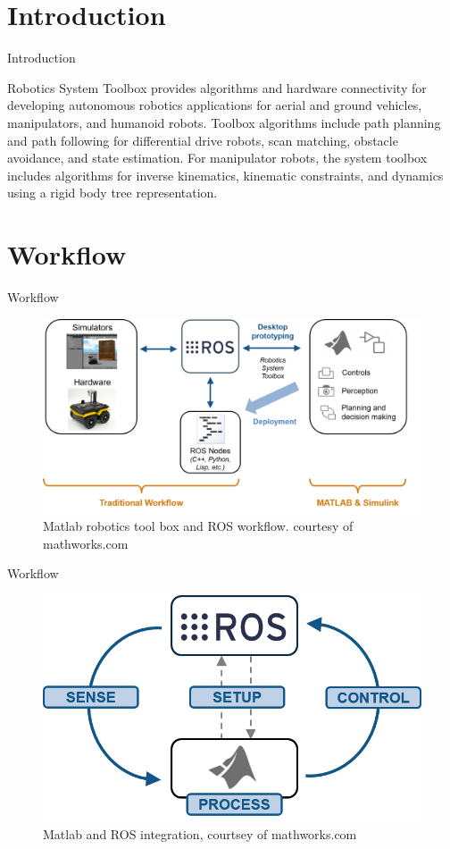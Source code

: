 \documentclass{beamer}
\begin{document}
\section{Introduction}
\begin{frame}{Introduction}
\begin{block}{}
Robotics System Toolbox provides algorithms and hardware connectivity for developing
autonomous robotics applications for aerial and ground vehicles, manipulators, and
humanoid robots. Toolbox algorithms include path planning and path following for
differential drive robots, scan matching, obstacle avoidance, and state estimation. For
manipulator robots, the system toolbox includes algorithms for inverse kinematics,
kinematic constraints, and dynamics using a rigid body tree representation.
\end{block}

\end{frame}
\section{Workflow}
\begin{frame}{Workflow}

\begin{figure}[1]

\includegraphics[scale=0.3]{figs/img/matlabworkflow.png}
\caption{Matlab robotics tool box and ROS workflow. courtesy of mathworks.com}
\end{figure}
\end{frame}
\begin{frame}{Workflow}
\begin{figure}
\includegraphics[scale=0.5]{figs/img/matlabros.png}
\caption{Matlab and ROS integration, courtsey of mathworks.com}
\end{figure}

\end{frame}
\end{document}
